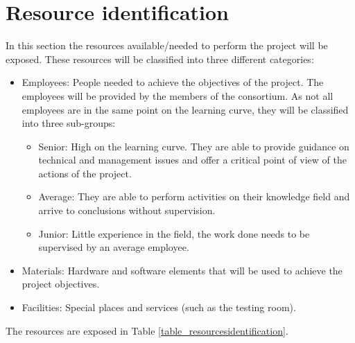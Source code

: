 \section{Resource identification}
In this section the resources available/needed to perform the project will be exposed. These resources will be classified into three different categories: 
\begin{itemize}
\item Employees: People needed to achieve the objectives of the project. The employees will be provided by the members of the consortium. As not all employees are in the same point on the learning curve, they will be classified into three sub-groups: 
\begin{itemize}
\item Senior: High on the learning curve. They are able to provide guidance on technical and management issues and offer a critical point of view of the actions of the project.
\item Average: They are able to perform activities on their knowledge field and arrive to conclusions without supervision.
\item Junior: Little experience in the field, the work done needs to be supervised by an average employee.
\end{itemize}
\item Materials: Hardware and software elements that will be used to achieve the project objectives.
\item Facilities: Special places and services (such as the testing room). 
\end{itemize}
The resources are exposed in Table \ref{table_resourcesidentification}.

